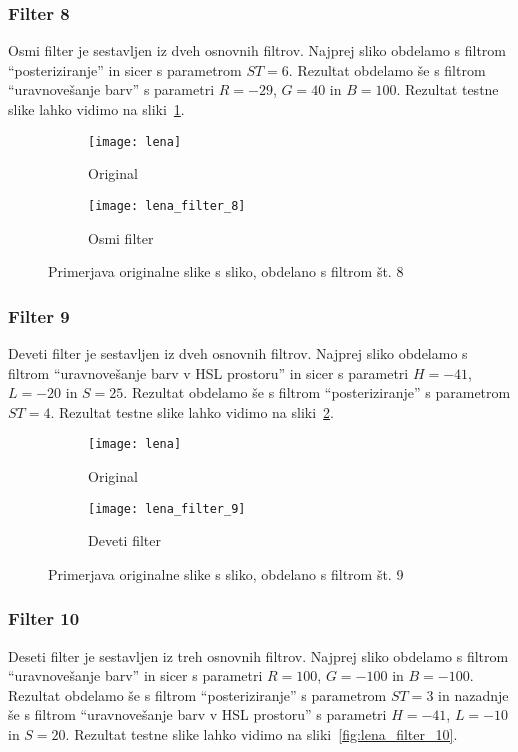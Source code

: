 \subsubsection*{Filter 8}
Osmi filter je sestavljen iz dveh osnovnih filtrov. Najprej sliko obdelamo s
filtrom ``posteriziranje'' in sicer s parametrom $ST = 6$. Rezultat obdelamo
še s filtrom ``uravnovešanje barv'' s parametri $R = -29$, $G = 40$ in $B = 100$.
Rezultat testne slike lahko vidimo na sliki~\ref{fig:lena_filter_8}.

\begin{figure}[!ht]
    \centering
    \begin{subfigure}[b]{0.4\textwidth}
        \texttt{[image: lena]}
        \caption{Original}
    \end{subfigure}
    \begin{subfigure}[b]{0.4\textwidth}
        \texttt{[image: lena\_filter\_8]}
        \caption{Osmi filter}
    \end{subfigure}
    \caption{Primerjava originalne slike s sliko, obdelano s filtrom št. 8}
    \label{fig:lena_filter_8}
\end{figure}


\subsubsection*{Filter 9}
Deveti filter je sestavljen iz dveh osnovnih filtrov. Najprej sliko obdelamo s
filtrom ``uravnovešanje barv v HSL prostoru'' in sicer s parametri $H = -41$,
$L = -20$ in $S = 25$. Rezultat obdelamo še s filtrom ``posteriziranje'' s
parametrom $ST = 4$. Rezultat testne slike lahko vidimo na
sliki~\ref{fig:lena_filter_9}.

\begin{figure}[!ht]
    \centering
    \begin{subfigure}[b]{0.4\textwidth}
        \texttt{[image: lena]}
        \caption{Original}
    \end{subfigure}
    \begin{subfigure}[b]{0.4\textwidth}
        \texttt{[image: lena\_filter\_9]}
        \caption{Deveti filter}
    \end{subfigure}
    \caption{Primerjava originalne slike s sliko, obdelano s filtrom št. 9}
    \label{fig:lena_filter_9}
\end{figure}


\subsubsection*{Filter 10}
Deseti filter je sestavljen iz treh osnovnih filtrov. Najprej sliko obdelamo s
filtrom ``uravnovešanje barv'' in sicer s parametri $R = 100$, $G = -100$ in
$B = -100$. Rezultat obdelamo še s filtrom ``posteriziranje'' s parametrom
$ST= 3$ in nazadnje še s filtrom ``uravnovešanje barv v HSL prostoru'' s
parametri $H = -41$, $L = -10$ in $S = 20$. Rezultat testne slike lahko
vidimo na sliki~\ref{fig:lena_filter_10}.

